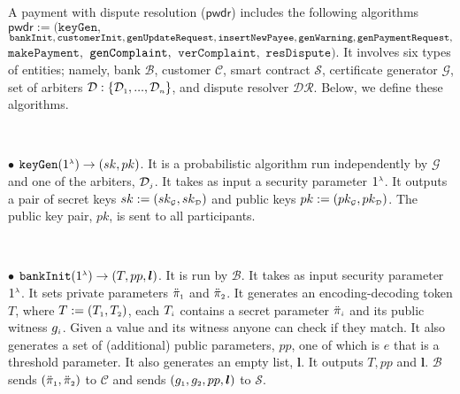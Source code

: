 
\begin{definition}
A payment with dispute resolution ($\mathsf{pwdr}$)   includes the following   algorithms $\mathsf{pwdr}:=(\mathtt{keyGen}, $ $\mathtt{bankInit}, \\\mathtt{customerInit},  \mathtt{genUpdateRequest}, \mathtt{insertNewPayee}, \mathtt{genWarning}, \mathtt{genPaymentRequest}, $ $\mathtt{makePayment}, $ $ \mathtt{genComplaint}, \\$ $\mathtt{verComplaint},$ $ \mathtt{resDispute})$. It involves  six   types of entities; namely,  bank $\mathcal{B}$, customer $\mathcal{C}$,  smart contract $\mathcal{S}$,  certificate generator $\mathcal{G}$,   set of arbiters $\mathcal{D}:\{\mathcal{D}_{\scriptscriptstyle 1},..., \mathcal{D}_{\scriptscriptstyle n}\}$, and  dispute resolver $\mathcal{DR}$. Below, we define these algorithms.  

%
\

\item [$\bullet$]  $\mathtt{keyGen}(1^{\scriptscriptstyle \lambda})\rightarrow (sk,pk)$. It is a probabilistic  algorithm run independently by  $\mathcal{G}$ and one of the arbiters, $\mathcal{D}_{\scriptscriptstyle j}$. It takes as input a security parameter $1^{\scriptscriptstyle \lambda}$. It outputs a pair of secret keys $sk:=(sk_{\scriptscriptstyle\mathcal {G}},sk_{\scriptscriptstyle\mathcal {D}})$ and public keys $pk:=(pk_{\scriptscriptstyle\mathcal {G}},pk_{\scriptscriptstyle\mathcal {D}})$. The public key pair, $pk$, is sent to all participants. 

\

\item[$\bullet$] $\mathtt{bankInit}(1^{\scriptscriptstyle \lambda})\rightarrow (T, pp, \bm{l})$. It is  run by  $\mathcal{B}$. It takes as input  security parameter $1^{\scriptscriptstyle \lambda}$.  It sets private parameters   $\ddot\pi_{\scriptscriptstyle 1}$ and $\ddot\pi_{\scriptscriptstyle 2}$. It generates an encoding-decoding token $T$, where  $T:=(T_{\scriptscriptstyle 1},T_{\scriptscriptstyle 2})$,  each $T_{\scriptscriptstyle i}$  contains  a secret parameter $\ddot\pi_{\scriptscriptstyle i}$ and its public witness $g_{\scriptscriptstyle i}$.    Given a  value and its witness anyone can check if they match. It also generates a set of (additional) public parameters,  $pp$, one of which is $e$ that is a threshold parameter.  It also generates an  empty list, $\bm{l}$. It outputs $T, pp$ and $\bm l$.  $\mathcal{B}$ sends $(\ddot\pi_{\scriptscriptstyle 1}, \ddot\pi_{\scriptscriptstyle 2})$ to $\mathcal{C}$ and sends $(g_{\scriptscriptstyle 1}, g_{\scriptscriptstyle 2},  pp, \bm {l})$ to $\mathcal{S}$.


\end{definition}
